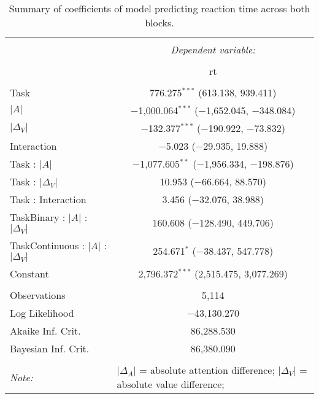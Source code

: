 
\begin{table}[t] \centering 
  \caption{Summary of coefficients of model predicting reaction time across both blocks.} 
  \label{table:rtModel} 
\begin{tabular}{@{\extracolsep{5pt}}lc} 
\\[-1.8ex]\hline 
\hline \\[-1.8ex] 
 & \multicolumn{1}{c}{\textit{Dependent variable:}} \\ 
\cline{2-2} 
\\[-1.8ex] & rt \\ 
\hline \\[-1.8ex] 
 Task & 776.275$^{***}$ (613.138, 939.411) \\ 
  $\vert A \vert$ & $-$1,000.064$^{***}$ ($-$1,652.045, $-$348.084) \\ 
  $\vert\Delta_V\vert$ & $-$132.377$^{***}$ ($-$190.922, $-$73.832) \\ 
  Interaction & $-$5.023 ($-$29.935, 19.888) \\ 
  Task : $\vert A \vert$ & $-$1,077.605$^{**}$ ($-$1,956.334, $-$198.876) \\ 
  Task : $\vert\Delta_V\vert$ & 10.953 ($-$66.664, 88.570) \\ 
  Task : Interaction & 3.456 ($-$32.076, 38.988) \\ 
  TaskBinary : $\vert A \vert$ :  $\vert\Delta_V\vert$ & 160.608 ($-$128.490, 449.706) \\ 
  TaskContinuous : $\vert A \vert$ :  $\vert\Delta_V\vert$ & 254.671$^{*}$ ($-$38.437, 547.778) \\ 
  Constant & 2,796.372$^{***}$ (2,515.475, 3,077.269) \\ 
 \hline \\[-1.8ex] 
Observations & 5,114 \\ 
Log Likelihood & $-$43,130.270 \\ 
Akaike Inf. Crit. & 86,288.530 \\ 
Bayesian Inf. Crit. & 86,380.090 \\ 
\hline 
\hline \\[-1.8ex] 
\textit{Note:}  & \multicolumn{1}{l}{\footnotesize $\vert\Delta_A\vert$ = absolute attention difference; $\vert\Delta_V\vert$ = absolute value difference; } \\ 
\end{tabular} 
\end{table} 
